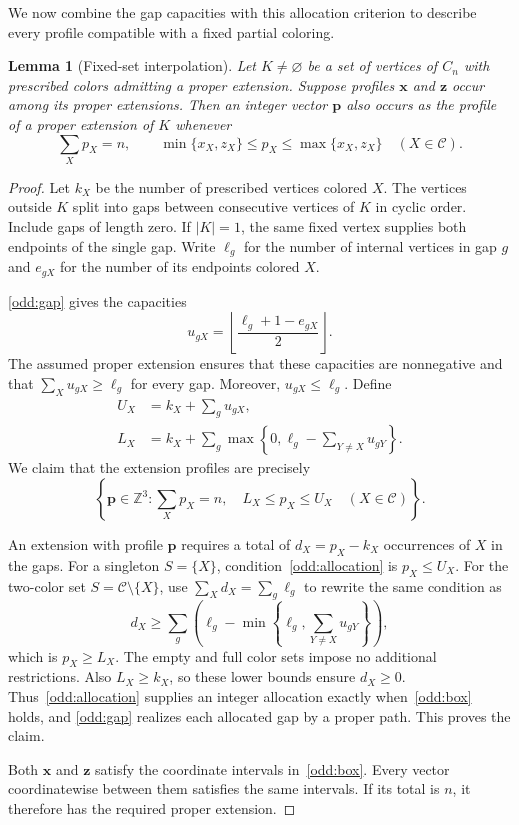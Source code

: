 \documentclass[11pt,reqno]{amsart}
\numberwithin{equation}{section}
\newtheorem{lemma}[theorem]{Lemma}
\theoremstyle{definition}
\theoremstyle{remark}
\begin{document}
We now combine the gap capacities with this allocation criterion to
describe every profile compatible with a fixed partial coloring.

\begin{lemma}[Fixed-set interpolation]\label{odd:interpolation}
Let $K\ne\varnothing$ be a set of vertices of $C_n$ with prescribed
colors admitting a proper extension. Suppose profiles $\mathbf x$ and
$\mathbf z$ occur among its proper extensions. Then an integer vector
$\mathbf p$ also occurs as the profile of a proper extension of $K$
whenever
\[
\sum_Xp_X=n,
\qquad
\min\{x_X,z_X\}\le p_X\le\max\{x_X,z_X\}
\quad(X\in\mathcal C).
\]
\end{lemma}
\begin{proof}
Let $k_X$ be the number of prescribed vertices colored $X$. The
vertices outside $K$ split into gaps between consecutive vertices of
$K$ in cyclic order. Include gaps of length zero. If $|K|=1$, the
same fixed vertex supplies both endpoints of the single gap.
Write $\ell_g$ for the number of internal vertices in gap $g$ and
$e_{gX}$ for the number of its endpoints colored $X$.

\cref{odd:gap} gives the capacities
\[
u_{gX}=\left\lfloor\frac{\ell_g+1-e_{gX}}2\right\rfloor.
\]
The assumed proper extension ensures that these capacities are
nonnegative and that $\sum_Xu_{gX}\ge\ell_g$ for every gap.
Moreover, $u_{gX}\le\ell_g$. Define
\begin{align*}
U_X&=k_X+\sum_gu_{gX},\\
L_X&=k_X+
\sum_g\max\left\{0,\ell_g-\sum_{Y\ne X}u_{gY}\right\}.
\end{align*}
We claim that the extension profiles are precisely
\begin{equation}\label{odd:box}
\left\{\mathbf p\in\mathbb Z^3:
\sum_Xp_X=n,\quad L_X\le p_X\le U_X
\quad(X\in\mathcal C)\right\}.
\end{equation}

An extension with profile $\mathbf p$ requires a total of
$d_X=p_X-k_X$ occurrences of $X$ in the gaps.
For a singleton $S=\{X\}$, condition~\eqref{odd:allocation} is
$p_X\le U_X$. For the two-color set
$S=\mathcal C\setminus\{X\}$, use $\sum_Xd_X=\sum_g\ell_g$ to rewrite
the same condition as
\[
d_X\ge\sum_g
\left(\ell_g-\min\left\{\ell_g,\sum_{Y\ne X}u_{gY}\right\}\right),
\]
which is $p_X\ge L_X$. The empty and full color sets impose no
additional restrictions. Also $L_X\ge k_X$, so these lower bounds
ensure $d_X\ge0$. Thus~\eqref{odd:allocation} supplies an integer
allocation exactly when~\eqref{odd:box} holds, and
\cref{odd:gap} realizes each allocated gap by a proper path.
This proves the claim.

Both $\mathbf x$ and $\mathbf z$ satisfy the coordinate intervals
in~\eqref{odd:box}. Every vector coordinatewise between them satisfies
the same intervals. If its total is $n$, it therefore has the required
proper extension.
\end{proof}
\end{document}
